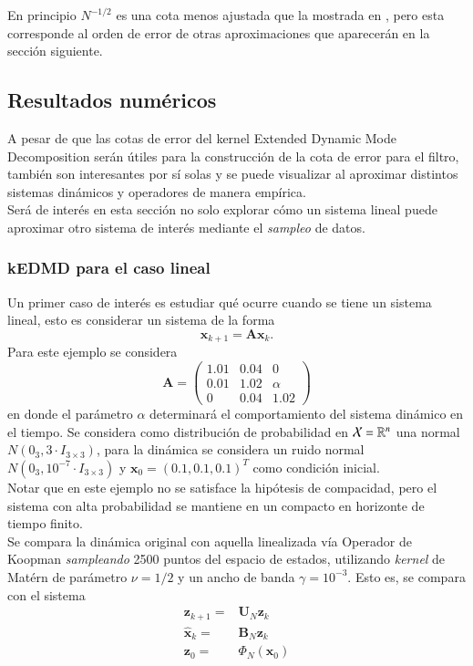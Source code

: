 	En principio $N^{-1/2}$ es una cota menos ajustada que la mostrada en \cite{Philipp2024ErrorOperator}, pero esta corresponde al orden de error de otras aproximaciones que aparecerán en la sección siguiente.


\subsection{Resultados numéricos}

A pesar de que las cotas de error del kernel Extended Dynamic Mode Decomposition serán útiles para la construcción de la cota de error para el filtro, también son interesantes por sí solas y se puede visualizar al aproximar distintos sistemas dinámicos y operadores de manera empírica.\\
Será de interés en esta sección no solo explorar cómo un sistema lineal puede aproximar otro sistema de interés mediante el \textit{sampleo} de datos.

\subsubsection{kEDMD para el caso lineal}

Un primer caso de interés es estudiar qué ocurre cuando se tiene un sistema lineal, esto es considerar un sistema de la forma
\begin{equation*}
    \mathbf{x}_{k+1} = \mathbf{A} \mathbf{x}_{k}.
\end{equation*}
Para este ejemplo se considera
\begin{equation*}
    \mathbf{A} = 
    \begin{pmatrix}
        1.01 & 0.04 & 0 \\
        0.01 & 1.02 & \alpha \\
        0 & 0.04 & 1.02
    \end{pmatrix}
\end{equation*}
en donde el parámetro $\alpha$ determinará el comportamiento del sistema dinámico en el tiempo. Se considera como distribución de probabilidad en $\mathcal{X} = \mathbb{R}^n$ una normal $N(0_{3}, 3 \cdot I_{3\times3})$, para la dinámica se considera un ruido normal $N(0_{3}, 10^{-7} \cdot I_{3\times3})$ y $\mathbf{x}_0 = (0.1, 0.1, 0.1)^T$ como condición inicial.\\
Notar que en este ejemplo no se satisface la hipótesis de compacidad, pero el sistema con alta probabilidad se mantiene en un compacto en horizonte de tiempo finito.\\
Se compara la dinámica original con aquella linealizada vía Operador de Koopman \textit{sampleando} 2500 puntos del espacio de estados, utilizando \textit{kernel} de Matérn de parámetro $\nu = 1/2$ y un ancho de banda $\gamma = 10^{-3}$. Esto es, se compara con el sistema
\begin{align*}
    \mathbf{z}_{k+1} = & \mathbf{U}_N \mathbf{z}_k \\
    \hat{\mathbf{x}}_k = & \mathbf{B}_N \mathbf{z}_k \\
    \mathbf{z}_0 = & \Phi_N(\mathbf{x}_0)
\end{align*}

